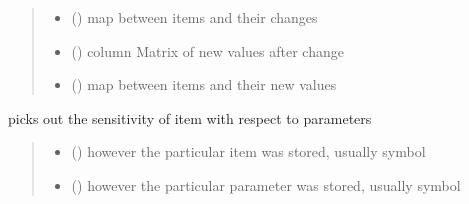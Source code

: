 \documentclass[letterpaper,10pt,english]{sphinxmanual}
\begin{document}
\begin{fulllineitems}
\begin{fulllineitems}
\begin{quote}
\begin{description}
\begin{itemize}
\item {} 
\sphinxAtStartPar
{} () \textendash{} map between items and their changes

\item {} 
\sphinxAtStartPar
{} () \textendash{} column Matrix of new values after change

\item {} 
\sphinxAtStartPar
{} () \textendash{} map between items and their new values

\end{itemize}


\end{description}\end{quote}

\end{fulllineitems}


\begin{fulllineitems}
\label{\detokenize{src.sensitivity.sensitivity_tools:src.sensitivity.sensitivity_tools.DifferentialMapping.sensitivity}}
\pysigstartsignatures
\pysiglinewithargsret
{}
{\sphinxparamcomma {}}
{}
\pysigstopsignatures
\sphinxAtStartPar
picks out the sensitivity of item with respect to parameters
\begin{quote}\begin{description}
\begin{itemize}
\item {} 
\sphinxAtStartPar
{} (\sphinxstyleliteralemphasis{\sphinxupquote{, }}) \textendash{} however the particular item was stored, usually symbol

\item {} 
\sphinxAtStartPar
{} (\sphinxstyleliteralemphasis{\sphinxupquote{, }}) \textendash{} however the particular parameter was stored, usually symbol


\end{itemize}
\end{description}
\end{quote}
\end{fulllineitems}
\end{fulllineitems}
\end{document}
